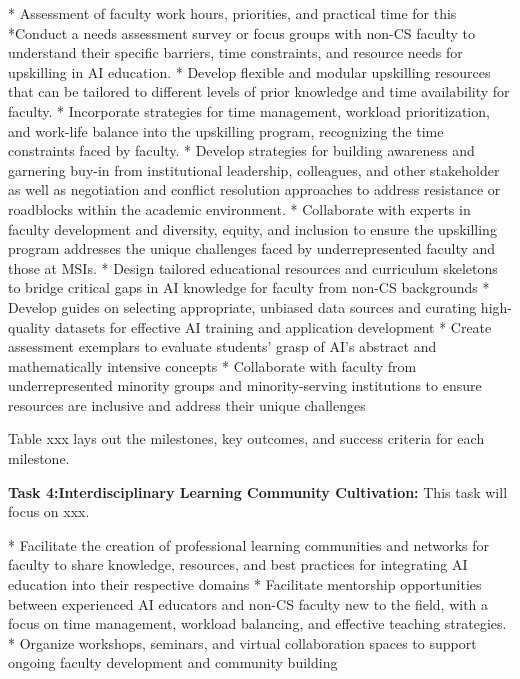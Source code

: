 \documentclass[11pt]{article}
\begin{document}
* Assessment of faculty work hours, priorities, and practical time for this
*Conduct a needs assessment survey or focus groups with non-CS faculty to understand their specific barriers, time constraints, and resource needs for upskilling in AI education.
* Develop flexible and modular upskilling resources that can be tailored to different levels of prior knowledge and time availability for faculty.
* Incorporate strategies for time management, workload prioritization, and work-life balance into the upskilling program, recognizing the time constraints faced by faculty.
* Develop strategies for building awareness and garnering buy-in from institutional leadership, colleagues, and other stakeholder as well as negotiation and conflict resolution approaches to address resistance or roadblocks within the academic environment.
* Collaborate with experts in faculty development and diversity, equity, and inclusion to ensure the upskilling program addresses the unique challenges faced by underrepresented faculty and those at MSIs.
* Design tailored educational resources and curriculum skeletons to bridge critical gaps in AI knowledge for faculty from non-CS backgrounds
* Develop guides on selecting appropriate, unbiased data sources and curating high-quality datasets for effective AI training and application development
* Create assessment exemplars to evaluate students' grasp of AI's abstract and mathematically intensive concepts
* Collaborate with faculty from underrepresented minority groups and minority-serving institutions to ensure resources are inclusive and address their unique challenges


Table xxx lays out the milestones, key outcomes, and success criteria for each milestone. 

\begin{tcolorbox}[colback=mycmykcolor, colframe=black, boxrule=1pt, coltext=black]
\textbf{Task 4:Interdisciplinary Learning Community Cultivation:} This task will focus on xxx.
\end{tcolorbox}
* Facilitate the creation of professional learning communities and networks for faculty to share knowledge, resources, and best practices for integrating AI education into their respective domains
* Facilitate mentorship opportunities between experienced AI educators and non-CS faculty new to the field, with a focus on time management, workload balancing, and effective teaching strategies.
* Organize workshops, seminars, and virtual collaboration spaces to support ongoing faculty development and community building
\end{document}
